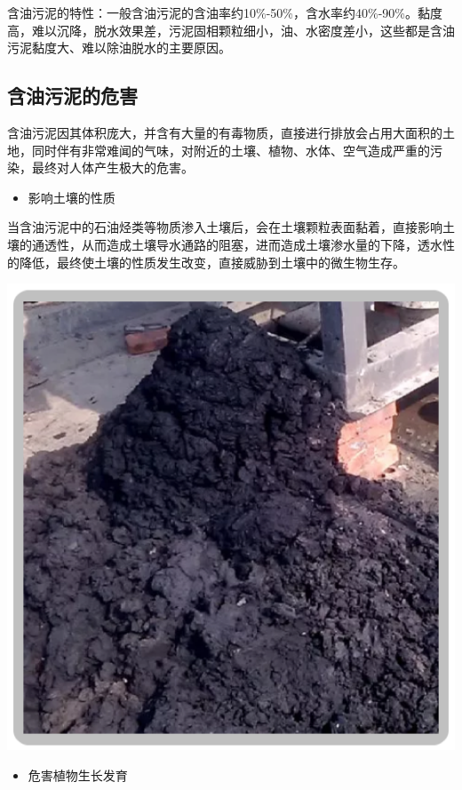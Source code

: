 \documentclass[]{book}
\providecommand{\tightlist}{%
  \setlength{\itemsep}{0pt}\setlength{\parskip}{0pt}}
\begin{document}
含油污泥的特性：一般含油污泥的含油率约10\%-50\%，含水率约40\%-90\%。黏度高，难以沉降，脱水效果差，污泥固相颗粒细小，油、水密度差小，这些都是含油污泥黏度大、难以除油脱水的主要原因。

\hypertarget{ux542bux6cb9ux6c61ux6ce5ux7684ux5371ux5bb3}{%
\subsection{含油污泥的危害}\label{ux542bux6cb9ux6c61ux6ce5ux7684ux5371ux5bb3}}

含油污泥因其体积庞大，并含有大量的有毒物质，直接进行排放会占用大面积的土地，同时伴有非常难闻的气味，对附近的土壤、植物、水体、空气造成严重的污染，最终对人体产生极大的危害。

\begin{itemize}
\tightlist
\item
  影响土壤的性质
\end{itemize}

当含油污泥中的石油烃类等物质渗入土壤后，会在土壤颗粒表面黏着，直接影响土壤的通透性，从而造成土壤导水通路的阻塞，进而造成土壤渗水量的下降，透水性的降低，最终使土壤的性质发生改变，直接威胁到土壤中的微生物生存。

\includegraphics[width=8in]{images/youni4}

\begin{itemize}
\tightlist
\item
  危害植物生长发育
\end{itemize}
\end{document}
